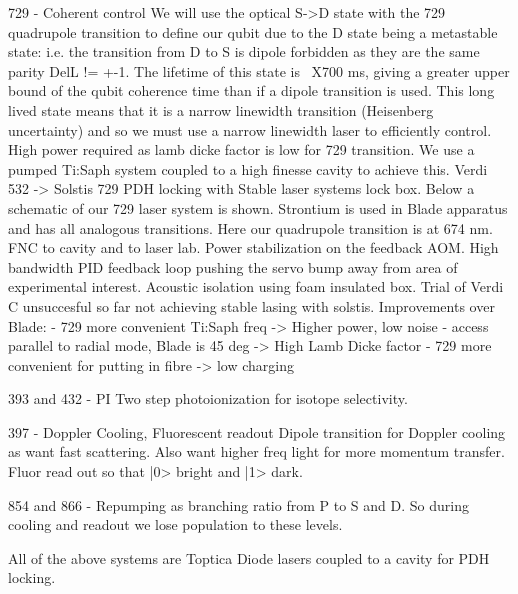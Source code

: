 729 - Coherent control
We will use the optical S->D state with the 729 quadrupole transition
to define our qubit due to the D state being a metastable state:
i.e. the transition from D to S is dipole forbidden as they are the
same parity DelL != +-1. The lifetime of this state is ~X700 ms,
giving a greater upper bound of the qubit coherence time than if a
dipole transition is used. This long lived state means that it is a
narrow linewidth transition (Heisenberg uncertainty) and so we must
use a narrow linewidth laser to efficiently control.  High power
required as lamb dicke factor is low for 729 transition.  We use a
pumped Ti:Saph system coupled to a high finesse cavity to achieve
this.  Verdi 532 -> Solstis 729 PDH locking with Stable laser systems
lock box. Below a schematic of our 729 laser system is
shown. Strontium is used in Blade apparatus and has all analogous
transitions. Here our quadrupole transition is at 674 nm.  FNC to
cavity and to laser lab. Power stabilization on the feedback AOM. High
bandwidth PID feedback loop pushing the servo bump away from area of
experimental interest. Acoustic isolation using foam insulated box.
Trial of Verdi C unsuccesful so far not achieving stable lasing with
solstis.
Improvements over Blade:
- 729 more convenient Ti:Saph freq -> Higher power, low noise
- access parallel to radial mode, Blade is 45 deg -> High Lamb Dicke
factor
- 729 more convenient for putting in fibre -> low charging


393 and 432 - PI 
Two step photoionization for isotope selectivity.

397 - Doppler Cooling, Fluorescent readout
Dipole transition for Doppler cooling as want fast scattering. Also
want higher freq light for more momentum transfer.
Fluor read out so that |0> bright and |1> dark.

854 and 866 - Repumping as branching ratio from P to S and D. So
during cooling and readout we lose population to these levels.

All of the above systems are Toptica Diode lasers coupled to a cavity
for PDH locking.


\subtitle{The vacuum system}

